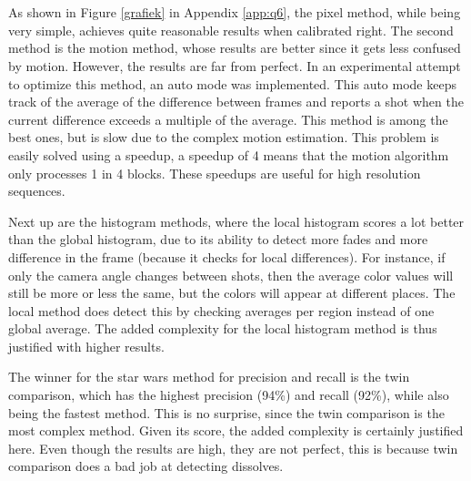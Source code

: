 \section[A discussion of the differences between the video shot detection methods, and the influence of these differences on 1) the precision and recall values and 2) the computational complexity]{}

As shown in Figure \ref{grafiek} in Appendix \ref{app:q6}, the pixel method, while being very simple, achieves quite reasonable results when calibrated right. The second method is the motion method, whose results are better since it gets less confused by motion. However, the results are far from perfect. In an experimental attempt to optimize this method, an auto mode was implemented. This auto mode keeps track of the average of the difference between frames and reports a shot when the current difference exceeds a multiple of the average. This method is among the best ones, but is slow due to the complex motion estimation. This problem is easily solved using a speedup, a speedup of 4 means that the motion algorithm only processes 1 in 4 blocks. These speedups are useful for high resolution sequences.

Next up are the histogram methods, where the local histogram scores a lot better than the global histogram, due to its ability to detect more fades and more difference in the frame (because it checks for local differences). For instance, if only the camera angle changes between shots, then the average color values will still be more or less the same, but the colors will appear at different places. The local method does detect this by checking averages per region instead of one global average. The added complexity for the local histogram method is thus justified with higher results.

The winner for the star wars method for precision and recall is the twin comparison, which has the highest precision (94\%) and recall (92\%), while also being the fastest method. This is no surprise, since the twin comparison is the most complex method. Given its score, the added complexity is certainly justified here. Even though the results are high, they are not perfect, this is because twin comparison does a bad job at detecting dissolves.
\\